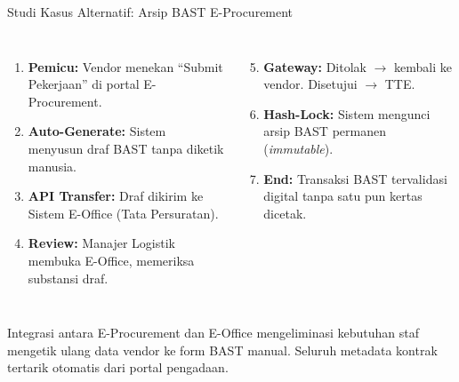 \documentclass[aspectratio=169,11pt]{beamer}
\begin{document}
\begin{frame}{Studi Kasus Alternatif: Arsip BAST E-Procurement}
    \vspace{0.1cm}
    \begin{premiumbox}
        \scriptsize
        \begin{columns}[T]
            \begin{enumerate}
                \item \textbf{Pemicu:} Vendor menekan ``Submit Pekerjaan'' di portal E-Procurement.
                \item \textbf{Auto-Generate:} Sistem menyusun draf BAST tanpa diketik manusia.
                \item \textbf{API Transfer:} Draf dikirim ke Sistem E-Office (Tata Persuratan).
                \item \textbf{Review:} Manajer Logistik membuka E-Office, memeriksa substansi draf.
            \end{enumerate}
            
            \begin{enumerate}\setcounter{enumi}{4}
                \item \textbf{Gateway:} Ditolak $\rightarrow$ kembali ke vendor. Disetujui $\rightarrow$ TTE.
                \item \textbf{Hash-Lock:} Sistem mengunci arsip BAST permanen (\textit{immutable}).
                \item \textbf{End:} Transaksi BAST tervalidasi digital tanpa satu pun kertas dicetak.
            \end{enumerate}
        \end{columns}
    \end{premiumbox}
    \vspace{0.1cm}
    \begin{orangebox}
        \scriptsize Integrasi antara E-Procurement dan E-Office mengeliminasi kebutuhan staf mengetik ulang data vendor ke form BAST manual. Seluruh metadata kontrak tertarik otomatis dari portal pengadaan.
    \end{orangebox}
\end{frame}
\end{document}
